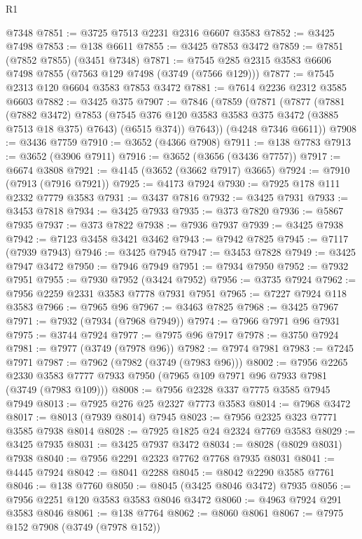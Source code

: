 \begin{lexlean}{R1}
\begin{coremodule}
    @7348
@7851 := @3725 @7513 @2231 @2316 @6607 @3583
@7852 := @3425 @7498
@7853 := @138 @6611
@7855 := @3425 @7853 @3472
@7859 := @7851 (@7852 @7855) (@3451 @7348)
@7871 := @7545 @285 @2315 @3583 @6606 @7498 @7855 (@7563 @129 @7498 (@3749 (@7566 @129)))
@7877 := @7545 @2313 @120 @6604 @3583 @7853 @3472
@7881 := @7614 @2236 @2312 @3585 @6603
@7882 := @3425 @375
@7907 := @7846
    (@7859
      (@7871
        (@7877
          (@7881
            (@7882 @3472)
            @7853
            (@7545 @376 @120 @3583 @3583 @375 @3472 (@3885 @7513 @18 @375) @7643)
            (@6515 @374))
          @7643))
      (@4248 @7346 @6611))
@7908 := @3436 @7759
@7910 := @3652 (@4366 @7908)
@7911 := @138 @7783
@7913 := @3652 (@3906 @7911)
@7916 := @3652 (@3656 (@3436 @7757))
@7917 := @6674 @3808
@7921 := @4145 (@3652 (@3662 @7917) @3665)
@7924 := @7910 (@7913 (@7916 @7921))
@7925 := @4173 @7924
@7930 := @7925 @178 @111 @2332 @7779 @3583
@7931 := @3437 @7816
@7932 := @3425 @7931
@7933 := @3453 @7818
@7934 := @3425 @7933
@7935 := @373 @7820
@7936 := @5867 @7935
@7937 := @373 @7822
@7938 := @7936 @7937
@7939 := @3425 @7938
@7942 := @7123 @3458 @3421 @3462
@7943 := @7942 @7825
@7945 := @7117 (@7939 @7943)
@7946 := @3425 @7945
@7947 := @3453 @7828
@7949 := @3425 @7947 @3472
@7950 := @7946 @7949
@7951 := @7934 @7950
@7952 := @7932 @7951
@7955 := @7930 @7952 (@3424 @7952)
@7956 := @3735 @7924
@7962 := @7956 @2259 @2331 @3583 @7778 @7931 @7951
@7965 := @7227 @7924 @118 @3583
@7966 := @7965 @96
@7967 := @3463 @7825
@7968 := @3425 @7967
@7971 := @7932 (@7934 (@7968 @7949))
@7974 := @7966 @7971 @96 @7931
@7975 := @3744 @7924
@7977 := @7975 @96 @7917
@7978 := @3750 @7924
@7981 := @7977 (@3749 (@7978 @96))
@7982 := @7974 @7981
@7983 := @7245 @7971
@7987 := @7962 (@7982 (@3749 (@7983 @96)))
@8002 := @7956
    @2265
    @2330
    @3583
    @7777
    @7933
    @7950
    (@7965 @109 @7971 @96 @7933 @7981 (@3749 (@7983 @109)))
@8008 := @7956 @2328 @337 @7775 @3585 @7945 @7949
@8013 := @7925 @276 @25 @2327 @7773 @3583
@8014 := @7968 @3472
@8017 := @8013 (@7939 @8014) @7945
@8023 := @7956 @2325 @323 @7771 @3585 @7938 @8014
@8028 := @7925 @1825 @24 @2324 @7769 @3583
@8029 := @3425 @7935
@8031 := @3425 @7937 @3472
@8034 := @8028 (@8029 @8031) @7938
@8040 := @7956 @2291 @2323 @7762 @7768 @7935 @8031
@8041 := @4445 @7924
@8042 := @8041 @2288
@8045 := @8042 @2290 @3585 @7761
@8046 := @138 @7760
@8050 := @8045 (@3425 @8046 @3472) @7935
@8056 := @7956 @2251 @120 @3583 @3583 @8046 @3472
@8060 := @4963 @7924 @291 @3583 @8046
@8061 := @138 @7764
@8062 := @8060 @8061
@8067 := @7975 @152 @7908 (@3749 (@7978 @152))

\end{coremodule}
\end{lexlean}
